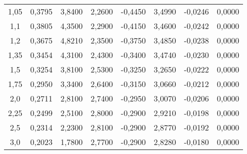 \begin{table}[ht]
\begin{tabular}{c|c|c|c|c|c|c|c}
1,05  & 0,3795 & 3,8400 & 2,2600 & -0,4450 & 3,4990 & -0,0246 & 0,0000 \\
1,1   & 0,3805 & 4,3500 & 2,2900 & -0,4150 & 3,4600 & -0,0242 & 0,0000 \\
1,2   & 0,3675 & 4,8210 & 2,3500 & -0,3750 & 3,4850 & -0,0238 & 0,0000 \\
1,35  & 0,3454 & 4,3100 & 2,4300 & -0,3400 & 3,4740 & -0,0230 & 0,0000 \\
1,5   & 0,3254 & 3,8100 & 2,5300 & -0,3250 & 3,2650 & -0,0222 & 0,0000 \\
1,75  & 0,2950 & 3,3400 & 2,6400 & -0,3150 & 3,0660 & -0,0212 & 0,0000 \\
2,0   & 0,2711 & 2,8100 & 2,7400 & -0,2950 & 3,0070 & -0,0206 & 0,0000 \\
2,25  & 0,2499 & 2,5100 & 2,8000 & -0,2900 & 2,9210 & -0,0198 & 0,0000 \\
2,5   & 0,2314 & 2,2300 & 2,8100 & -0,2900 & 2,8770 & -0,0192 & 0,0000 \\
3,0   & 0,2023 & 1,7800 & 2,7700 & -0,2900 & 2,8280 & -0,0180 & 0,0000
\end{tabular}
\label{tab:apendice-coeficientes-combasebleed-300K}
\end{table}